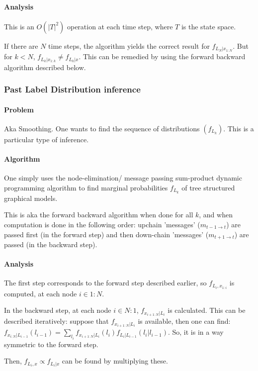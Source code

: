 \documentclass[oneside, article]{memoir}
\begin{document}
\paragraph{Analysis}
This is an $O(|T|^{2})$ operation at each time step, where $T$ is the state space.

If there are $N$ time steps, the algorithm yields the correct result for $f_{L_N|x_{1:N}}$. But for $k < N$, $f_{L_k|x_{1:k}} \neq f_{L_k|x}$. This can be remedied by using the forward backward algorithm described below.

\subsubsection{Past Label Distribution inference}
\paragraph{Problem}
Aka Smoothing. One wants to find the sequence of distributions $(f_{L_k})$. This is a particular type of inference.

\paragraph{Algorithm}
One simply uses the node-elimination/ message passing sum-product dynamic programming algorithm to find marginal probabilities $f_{L_k}$ of tree structured graphical models.

This is aka the forward backward algorithm when done for all $k$, and when computation is done in the following order: upchain 'messages' ($m_{t-1 \to t}$) are passed first (in the forward step) and then down-chain 'messages' ($m_{t+1 \to t}$) are passed (in the backward step).

\paragraph{Analysis}
The first step corresponds to the forward step described earlier, so $f_{L_i, x_{1:i}}$ is computed, at each node $i \in 1:N$.

In the backward step, at each node $i \in N:1$, $f_{x_{i+1:N}|L_i}$ is calculated. This can be described iteratively: suppose that $f_{x_{i+1:N}|L_i}$ is available, then one can find: $f_{x_{i:N}|L_{i-1}}(l_{i-1}) = \sum_{l_i} f_{x_{i+1:N}|L_i}(l_i) f_{L_i|L_{i-1}}(l_i|l_{i-1})$. So, it is in a way symmetric to the forward step.

Then, $f_{L_i, x} \propto f_{L_i| x}$ can be found by multiplying these.
\end{document}
